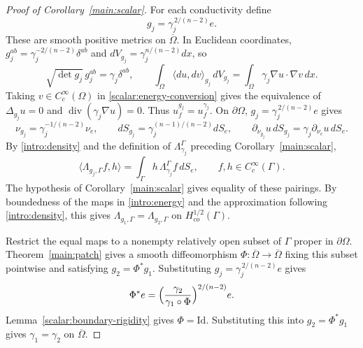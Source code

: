 \documentclass[11pt,a4paper]{article}
\theoremstyle{definition}
\theoremstyle{remark}
\newcommand{\Id}{\mathrm{Id}}
\numberwithin{equation}{section}
\begin{document}
\begin{proof}[Proof of Corollary~\ref{main:scalar}]
For each conductivity define
\[
 g_j=\gamma_j^{\,2/(n-2)}e.
\]
These are smooth positive metrics on $\overline\Omega$. In Euclidean
coordinates, $g_j^{ab}=\gamma_j^{-2/(n-2)}\delta^{ab}$ and
$dV_{g_j}=\gamma_j^{n/(n-2)}dx$, so
\begin{equation}\label{scalar:energy-conversion}
 \sqrt{\det g_j}\,g_j^{ab}=\gamma_j\delta^{ab},\qquad
 \int_\Omega\langle du,dv\rangle_{g_j}\,dV_{g_j}
       =\int_\Omega\gamma_j\nabla u\cdot\nabla v\,dx.
\end{equation}
Taking $v\in C_c^\infty(\Omega)$ in \eqref{scalar:energy-conversion}
gives the equivalence of $\Delta_{g_j}u=0$ and
$\operatorname{div}(\gamma_j\nabla u)=0$. Thus $u_f^{g_j}=u_f^{\gamma_j}$.
On $\partial\Omega$, $g_j=\gamma_j^{\,2/(n-2)}e$ gives
\[
 \nu_{g_j}=\gamma_j^{-1/(n-2)}\nu_e,\qquad
 dS_{g_j}=\gamma_j^{(n-1)/(n-2)}dS_e,\qquad
 \partial_{\nu_{g_j}}u\,dS_{g_j}
       =\gamma_j\partial_{\nu_e}u\,dS_e.
\]
By \eqref{intro:density} and the definition of $\Lambda_{\gamma_j}^\Gamma$
preceding Corollary~\ref{main:scalar},
\[
 \langle\Lambda_{g_j,\Gamma}f,h\rangle
 =\int_\Gamma h\,\Lambda_{\gamma_j}^\Gamma f\,dS_e,
 \qquad f,h\in C_c^\infty(\Gamma).
\]
The hypothesis of Corollary~\ref{main:scalar} gives equality of these
pairings. By boundedness of the maps in \eqref{intro:energy} and the
approximation following \eqref{intro:density}, this gives
$\Lambda_{g_1,\Gamma}=\Lambda_{g_2,\Gamma}$ on
$H^{1/2}_{co}(\Gamma)$.

Restrict the equal maps to a nonempty relatively open subset of $\Gamma$
proper in $\partial\Omega$. Theorem~\ref{main:patch} gives a smooth
diffeomorphism $\Phi:\overline\Omega\to\overline\Omega$ fixing this
subset pointwise and satisfying $g_2=\Phi^*g_1$. Substituting
$g_j=\gamma_j^{\,2/(n-2)}e$ gives
\[
 \Phi^*e=\Bigl(\frac{\gamma_2}{\gamma_1\circ\Phi}\Bigr)^{2/(n-2)}e.
\]
Lemma~\ref{scalar:boundary-rigidity} gives $\Phi=\Id$. Substituting
this into $g_2=\Phi^*g_1$ gives $\gamma_1=\gamma_2$ on $\overline\Omega$.
\end{proof}
\end{document}
